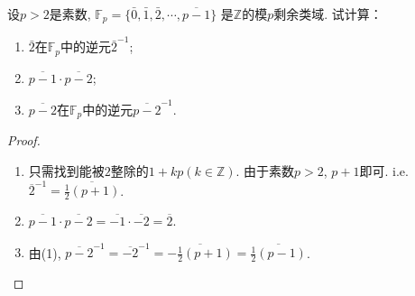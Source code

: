 \begin{problem}
    设$p > 2$是素数,
$\mathbb{F}_p = \{\bar{0}, \bar{1}, \bar{2}, \cdots, \overline{p-1}\}$
是$\mathbb{Z}$的模$p$剩余类域. 试计算：
\begin{enumerate}[(1)]
    \item $\bar{2}$在$\mathbb{F}_p$中的逆元$\bar{2}^{-1}$;
    \item $\overline{p - 1} \cdot \overline{p - 2}$;
    \item $\overline{p - 2}$在$\mathbb{F}_p$中的逆元$\overline{p-2}^{-1}$.
\end{enumerate}
\end{problem}

\begin{proof}
\begin{enumerate}[(1)]
    \item 只需找到能被$2$整除的$1 + kp(k \in \mathbb{Z})$.
由于素数$p > 2$, $p + 1$即可. i.e. $\overline{2}^{-1} = \overline{\frac12(p + 1)}$.
    \item $\overline{p - 1} \cdot \overline{p - 2} = \overline{-1} \cdot \overline{-2} = \overline{2}$.
    \item 由(1), $\overline{p - 2}^{-1} = \overline{-2}^{-1} = \overline{-\frac12(p + 1)} = \overline{\frac12(p - 1)}$.
\end{enumerate}
\end{proof}
    